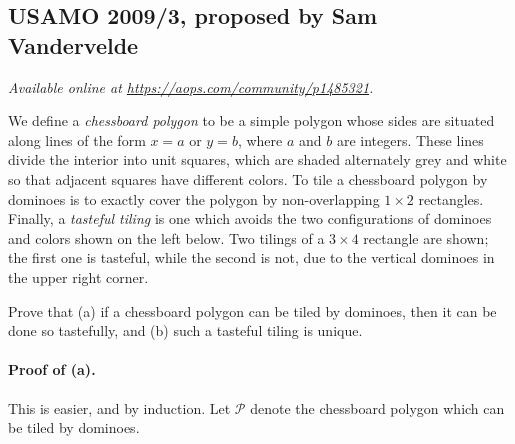 \documentclass[11pt]{scrartcl}
\begin{document}
\subsection{USAMO 2009/3, proposed by Sam Vandervelde}
\textsl{Available online at \url{https://aops.com/community/p1485321}.}
\begin{mdframed}[style=mdpurplebox,frametitle={Problem statement}]
We define a \emph{chessboard polygon} to be a simple polygon whose sides are
situated along lines of the form $x=a$ or $y=b$, where $a$ and $b$ are integers.
These lines divide the interior into unit squares, which are shaded alternately
grey and white so that adjacent squares have different colors.
To tile a chessboard polygon by dominoes is to
exactly cover the polygon by non-overlapping $ 1 \times 2$ rectangles.
Finally, a \emph{tasteful tiling} is one which avoids the
two configurations of dominoes and colors shown on the left below.
Two tilings of a $3 \times 4$ rectangle are shown;
the first one is tasteful, while the second is not,
due to the vertical dominoes in the upper right corner.

\begin{center}
\end{center}

Prove that (a) if a chessboard polygon can be tiled by dominoes,
then it can be done so tastefully, and (b) such a tasteful tiling is unique.
\end{mdframed}
\paragraph{Proof of (a).} This is easier, and by induction.
Let $\mathcal P$ denote the chessboard polygon which can be tiled by dominoes.
\end{document}
